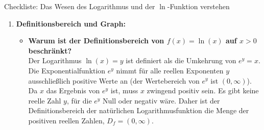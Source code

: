 \begin{loesungsumgebung}{Checkliste: Das Wesen des Logarithmus und der $\ln$-Funktion verstehen}
\begin{enumerate}[label=(\alph*)]
\begin{itemize}
        \item \textbf{Begründung für $\ln(1)=0$ und $\ln(e)=1$:}
        \begin{itemize}
            \item $\ln(1)=0$: Wir suchen die Zahl $x$, für die $e^x=1$ gilt. Da jede Zahl (außer 0) hoch 0 gleich 1 ist, also $e^0=1$, muss $\ln(1)=0$ sein.
            \item $\ln(e)=1$: Wir suchen die Zahl $x$, für die $e^x=e$ gilt. Dies ist offensichtlich $x=1$, da $e^1=e$. Also muss $\ln(e)=1$ sein.
        \end{itemize}
    \end{itemize}

    \item \textbf{Definitionsbereich und Graph:}
    \begin{itemize}
        \item \textbf{Warum ist der Definitionsbereich von $f(x)=\ln(x)$ auf $x>0$ beschränkt?} \\
        Der Logarithmus $\ln(x)=y$ ist definiert als die Umkehrung von $e^y=x$. Die Exponentialfunktion $e^y$ nimmt für alle reellen Exponenten $y$ ausschließlich positive Werte an (der Wertebereich von $e^y$ ist $(0, \infty)$). Da $x$ das Ergebnis von $e^y$ ist, muss $x$ zwingend positiv sein. Es gibt keine reelle Zahl $y$, für die $e^y$ Null oder negativ wäre.
        Daher ist der Definitionsbereich der natürlichen Logarithmusfunktion die Menge der positiven reellen Zahlen, $D_f = (0, \infty)$.


\end{itemize}
\end{enumerate}
\end{loesungsumgebung}
